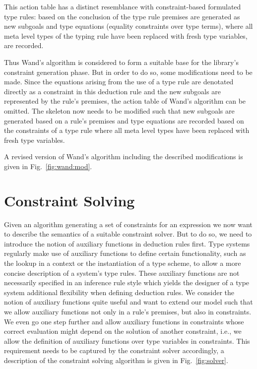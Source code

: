 This action table has a distinct resemblance with constraint-based
formulated type rules: based on the conclusion of the type rule
premises are generated as new subgoals and type equations (equality
constraints over type terms), where all meta level types of the typing
rule have been replaced with fresh type variables, are recorded.



Thus Wand's algorithm is considered to form a suitable base for the
library's constraint generation phase. But in order to do so, some
modifications need to be made. Since the equations arising from the
use of a type rule are denotated directly as a constraint in this
deduction rule and the new subgoals are represented by the rule's
premises, the action table of Wand's algorithm can be omitted. The
skeleton now needs to be modified such that new subgoals are generated
based on a rule's premises and type equations are recorded based on
the constraints of a type rule where all meta level types have been
replaced with fresh type variables.

A revised version of Wand's algorithm including the described
modifications is given in Fig.~\ref{fig:wand:mod}.

\section{Constraint Solving}
\label{sec:constraint-dissolving}

Given an algorithm generating a set of constraints for an expression
we now want to describe the semantics of a suitable constraint
solver. But to do so, we need to introduce the notion of auxiliary
functions in deduction rules first. Type systems regularly make use of
auxiliary functions to define certain functionality, such as the
lookup in a context or the instantiation of a type scheme, to allow a
more concise description of a system's type rules. These auxiliary
functions are not necessarily specified in an inference rule style
which yields the designer of a type system additional flexibility when
defining deduction rules. We consider the notion of auxiliary
functions quite useful and want to extend our model such that we allow
auxiliary functions not only in a rule's premises, but also in
constraints. We even go one step further and allow auxiliary functions
in constraints whose correct evaluation might depend on the solution
of another constraint, i.e., we allow the definition of auxiliary
functions over type variables in constraints. This requirement needs
to be captured by the constraint solver accordingly, a description of
the constraint solving algorithm is given in Fig.~\ref{fig:solver}.

